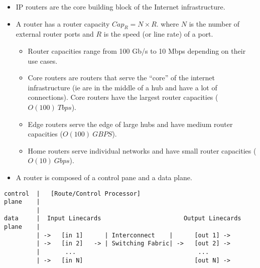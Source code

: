 \begin{itemize}
\tightlist
\item
  IP routers are the core building block of the Internet infrastructure.
\item
  A router has a router capacity \(Cap_R = N \times R\). where \(N\) is
  the number of external router ports and \(R\) is the speed (or line
  rate) of a port.

  \begin{itemize}
  \tightlist
  \item
    Router capacities range from 100 Gb/s to 10 Mbps depending on their
    use cases.
  \item
    Core routers are routers that serve the ``core'' of the internet
    infrastructure (ie are in the middle of a hub and have a lot of
    connections). Core routers have the largest router capacities
    (\(O(100)\ Tbps\)).
  \item
    Edge routers serve the edge of large hubs and have medium router
    capacities (\(O(100)\ GBPS\)).
  \item
    Home routers serve individual networks and have small router
    capacities (\(O(10)\ Gbps\)).
  \end{itemize}
\item
  A router is composed of a control pane and a data plane.
\end{itemize}

\begin{verbatim}
control  |   [Route/Control Processor]
plane    |
         |
data     |  Input Linecards                       Output Linecards
plane    |
         | ->   [in 1]      | Interconnect    |      [out 1] ->
         | ->   [in 2]   -> | Switching Fabric| ->   [out 2] ->
         |       ...                                  ...
         | ->   [in N]                               [out N] ->
\end{verbatim}

